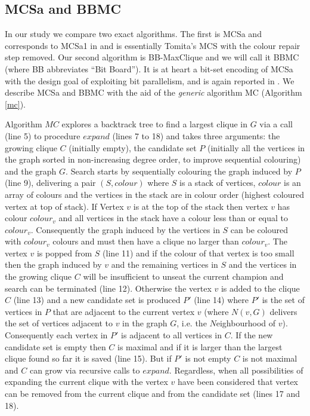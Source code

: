 \documentclass[runningheads]{llncs}
\begin{document}
\subsection{MCSa and BBMC}
In our study we compare two exact algorithms. The first is MCSa  and
corresponds to MCSa1 in \cite{exactProsser} and is essentially Tomita's MCS \cite{tomita2010} with the colour 
repair step removed. Our second algorithm is BB-MaxClique \cite{segundo2011} and we will call it BBMC (where BB abbreviates ``Bit Board'').
It is at heart a bit-set encoding of  MCSa with the design goal of exploiting bit parallelism, and is again reported
in \cite{exactProsser}. We describe MCSa and BBMC with the aid of the \emph{generic} algorithm MC (Algorithm \ref{mc}).

Algorithm $MC$ explores a backtrack tree to find a largest clique in $G$ via a call (line 5) to procedure $expand$ (lines 7 to 18) 
and takes three arguments:
the growing clique $C$ (initially empty), 
the candidate set $P$ (initially all the vertices in the graph sorted in non-increasing degree order,
to improve sequential colouring) and 
the graph $G$.
Search starts by sequentially colouring the graph \cite{welshPowell} induced by $P$ (line 9), delivering a pair $(S,colour)$ where $S$ is a stack
of vertices, $colour$ is an array of colours and the vertices in the stack are in colour order (highest coloured vertex at top of stack).
If Vertex $v$ is at the top of the stack then vertex $v$ has colour $colour_{v}$ and 
all vertices in the stack have a colour less than or equal to $colour_{v}$. Consequently the graph induced by the
vertices in $S$ can be coloured with $colour_{v}$ colours and must then have a clique no larger than $colour_{v}$.
The vertex $v$ is popped from $S$ (line 11) and if the colour of that vertex is too small then
the graph induced by $v$ and the remaining vertices in $S$ and the vertices in the growing clique $C$
will be insufficient to unseat the current champion and search can be terminated (line 12). 
Otherwise the vertex $v$ is added to the clique $C$ (line 13) 
and a new candidate set is produced $P'$  (line 14) where $P'$ is the set of vertices in $P$ that are adjacent to the current vertex $v$
(where $N(v,G)$ delivers the set of vertices adjacent to $v$ in the graph $G$, i.e. the $N$eighbourhood of $v$).
Consequently each vertex in $P'$ is adjacent to all vertices in $C$. If the new candidate set is empty then $C$ is maximal
and if it is larger than the largest clique found so far it is saved (line 15). But if $P'$ is not empty $C$ is not maximal
and $C$ can grow via recursive calls to $expand$. Regardless, when all possibilities of expanding the 
current clique with the vertex $v$ have been considered that vertex can be removed from the current clique
and from the candidate set (lines 17 and 18).
\end{document}
